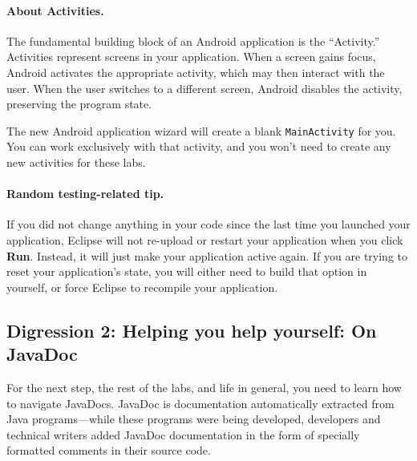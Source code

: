 \documentclass[10pt]{article}
\begin{document}
\paragraph{About Activities.}
The fundamental building block of an Android application is the ``Activity.'' Activities represent screens in your application. When a screen gains focus, Android activates the appropriate activity, which may then interact with the user. When the user switches to a different screen, Android disables the activity, preserving the program state.

The new Android application wizard will create a blank \texttt{MainActivity} for you. You can work exclusively with that activity, and you won't need to create any new activities for these labs. 



\paragraph{Random testing-related tip.} If you did not change anything in your code since the last time you launched your application, Eclipse will not re-upload or restart your application when you click \textbf{Run}. Instead, it will just make your application active again. If you are trying to reset your application's state, you will either need to build that option in yourself, or force Eclipse to recompile your application.

\subsection{Digression 2: Helping you help yourself: On JavaDoc} For the next step, the rest of the labs, and life in general, you need to learn how to navigate JavaDocs. JavaDoc is documentation automatically extracted from Java programs---while these programs were being developed, developers and technical writers added JavaDoc documentation in the form of specially formatted comments in their source code. 
\end{document}
